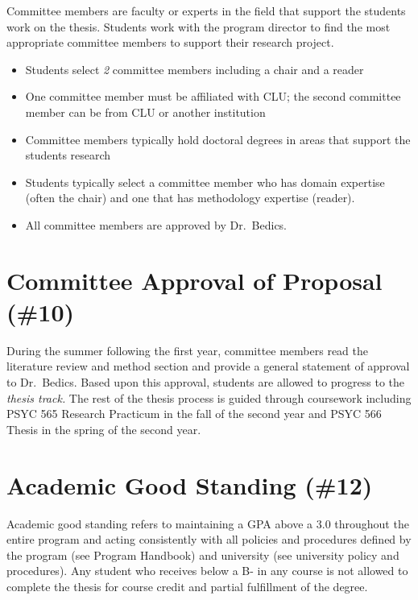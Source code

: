\documentclass[]{book}
\providecommand{\tightlist}{%
  \setlength{\itemsep}{0pt}\setlength{\parskip}{0pt}}
\begin{document}
Committee members are faculty or experts in the field that support the students work on the thesis. Students work with the program director to find the most appropriate committee members to support their research project.

\begin{itemize}
\tightlist
\item
  Students select \emph{2} committee members including a chair and a reader
\item
  One committee member must be affiliated with CLU; the second committee member can be from CLU or another institution
\item
  Committee members typically hold doctoral degrees in areas that support the students research
\item
  Students typically select a committee member who has domain expertise (often the chair) and one that has methodology expertise (reader).\\
\item
  All committee members are approved by Dr.~Bedics.
\end{itemize}

\hypertarget{committee-approval-of-proposal-10}{%
\section{Committee Approval of Proposal (\#10)}\label{committee-approval-of-proposal-10}}

During the summer following the first year, committee members read the literature review and method section and provide a general statement of approval to Dr.~Bedics. Based upon this approval, students are allowed to progress to the \emph{thesis track.} The rest of the thesis process is guided through coursework including PSYC 565 Research Practicum in the fall of the second year and PSYC 566 Thesis in the spring of the second year.

\hypertarget{academic-good-standing-12}{%
\section{Academic Good Standing (\#12)}\label{academic-good-standing-12}}

Academic good standing refers to maintaining a GPA above a 3.0 throughout the entire program and acting consistently with all policies and procedures defined by the program (see Program Handbook) and university (see university policy and procedures). Any student who receives below a B- in any course is not allowed to complete the thesis for course credit and partial fulfillment of the degree.
\end{document}
